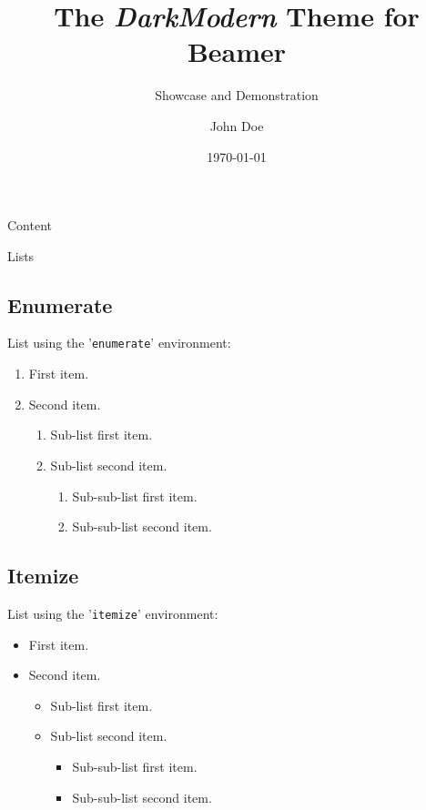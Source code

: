 \documentclass[8pt, handout, aspectratio = 1510]{beamer}
\title{The \textit{DarkModern} Theme for Beamer}
\subtitle{Showcase and Demonstration}
\author{John Doe}
\institute{Some Institution}
\date{\today}
\begin{document}
	\maketitle

	\begin{frame}[allowframebreaks]{Content}
		\tableofcontents
	\end{frame}

	\begin{frame}{Lists}
		\subsection{Enumerate}
		List using the '\texttt{enumerate}' environment:
		\begin{enumerate}
			\item First item.
			\item Second item.
			\begin{enumerate}
				\item Sub-list first item.
				\item Sub-list second item.
				\begin{enumerate}
					\item Sub-sub-list first item.
					\item Sub-sub-list second item.
				\end{enumerate}
			\end{enumerate}
		\end{enumerate}

		\vspace{5mm}
		\subsection{Itemize}
		List using the '\texttt{itemize}' environment:
		\begin{itemize}
			\item First item.
			\item Second item.
			\begin{itemize}
				\item Sub-list first item.
				\item Sub-list second item.
				\begin{itemize}
					\item Sub-sub-list first item.
					\item Sub-sub-list second item.
				\end{itemize}
			\end{itemize}
		\end{itemize}
	\end{frame}
\end{document}
